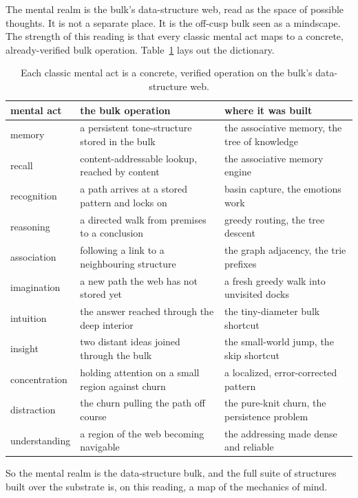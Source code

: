 The mental realm is the bulk's data-structure web, read as the space of possible thoughts. It is not a separate place. It is the off-cusp bulk seen as a mindscape. The strength of this reading is that every classic mental act maps to a concrete, already-verified bulk operation. Table~\ref{tab:mental-acts} lays out the dictionary.

\begin{table}[ht]
\centering
\begin{tabular}{@{}lll@{}}
\toprule
mental act & the bulk operation & where it was built \\
\midrule
memory & a persistent tone-structure stored in the bulk & the associative memory, the tree of knowledge \\
recall & content-addressable lookup, reached by content & the associative memory engine \\
recognition & a path arrives at a stored pattern and locks on & basin capture, the emotions work \\
reasoning & a directed walk from premises to a conclusion & greedy routing, the tree descent \\
association & following a link to a neighbouring structure & the graph adjacency, the trie prefixes \\
imagination & a new path the web has not stored yet & a fresh greedy walk into unvisited docks \\
intuition & the answer reached through the deep interior & the tiny-diameter bulk shortcut \\
insight & two distant ideas joined through the bulk & the small-world jump, the skip shortcut \\
concentration & holding attention on a small region against churn & a localized, error-corrected pattern \\
distraction & the churn pulling the path off course & the pure-knit churn, the persistence problem \\
understanding & a region of the web becoming navigable & the addressing made dense and reliable \\
\bottomrule
\end{tabular}
\caption{Each classic mental act is a concrete, verified operation on the bulk's data-structure web.}
\label{tab:mental-acts}
\end{table}

So the mental realm is the data-structure bulk, and the full suite of structures built over the substrate is, on this reading, a map of the mechanics of mind.

